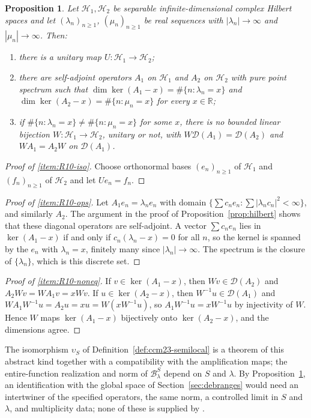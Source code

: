 \documentclass[11pt]{amsart}
\theoremstyle{plain}
\newtheorem{proposition}[theorem]{Proposition}
\theoremstyle{definition}
\theoremstyle{remark}
\numberwithin{equation}{section}
\newcommand{\R}{\mathbb{R}}
\newcommand{\cH}{\mathscr{H}}
\begin{document}
\begin{proposition}\label{prop:R10}
Let $\cH_1,\cH_2$ be separable infinite-dimensional complex Hilbert
spaces and let $(\lambda_n)_{n\ge1}$, $(\mu_n)_{n\ge1}$ be real sequences
with $|\lambda_n|\to\infty$ and $|\mu_n|\to\infty$. Then:
\begin{enumerate}[label=(\roman*)]
\item\label{item:R10-iso} there is a unitary map $U:\cH_1\to\cH_2$;
\item\label{item:R10-ops} there are self-adjoint operators $A_1$ on
  $\cH_1$ and $A_2$ on $\cH_2$ with pure point spectrum such that
  $\dim\ker(A_1-x)=\#\{n:\lambda_n=x\}$ and
  $\dim\ker(A_2-x)=\#\{n:\mu_n=x\}$ for every $x\in\R$;
\item\label{item:R10-noneq} if $\#\{n:\lambda_n=x\}\ne\#\{n:\mu_n=x\}$
  for some $x$, there is no bounded linear bijection
  $W:\cH_1\to\cH_2$, unitary or not, with
  $W\mathcal D(A_1)=\mathcal D(A_2)$ and $WA_1=A_2W$ on
  $\mathcal D(A_1)$.
\end{enumerate}
\end{proposition}

\begin{proof}[Proof of \ref{item:R10-iso}]
Choose orthonormal bases $(e_n)_{n\ge1}$ of $\cH_1$ and $(f_n)_{n\ge1}$
of $\cH_2$ and let $Ue_n=f_n$.
\end{proof}

\begin{proof}[Proof of \ref{item:R10-ops}]
Let $A_1e_n=\lambda_ne_n$ with domain
$\{\sum c_ne_n:\sum|\lambda_nc_n|^2<\infty\}$, and similarly $A_2$. The
argument in the proof of Proposition~\ref{prop:hilbert} shows that these
diagonal operators are self-adjoint. A vector $\sum c_ne_n$ lies in
$\ker(A_1-x)$ if and only if $c_n(\lambda_n-x)=0$ for all $n$, so the
kernel is spanned by the $e_n$ with $\lambda_n=x$, finitely many since
$|\lambda_n|\to\infty$. The spectrum is the closure of $\{\lambda_n\}$,
which is this discrete set.
\end{proof}

\begin{proof}[Proof of \ref{item:R10-noneq}]
If $v\in\ker(A_1-x)$, then $Wv\in\mathcal D(A_2)$ and
$A_2Wv=WA_1v=xWv$. If $u\in\ker(A_2-x)$, then
$W^{-1}u\in\mathcal D(A_1)$ and $WA_1W^{-1}u=A_2u=xu=W(xW^{-1}u)$,
so $A_1W^{-1}u=xW^{-1}u$ by injectivity of $W$. Hence $W$ maps
$\ker(A_1-x)$ bijectively onto $\ker(A_2-x)$, and the dimensions
agree.
\end{proof}

The isomorphism $\upsilon_S$ of Definition~\ref{def:ccm23-semilocal} is
a theorem of this abstract kind together with a compatibility with the
amplification maps; the entire-function realization and norm of
$\mathcal B^S_\lambda$ depend on $S$ and $\lambda$. By
Proposition~\ref{prop:R10}, an identification with the global space of
Section~\ref{sec:debranges} would need an intertwiner of the specified
operators, the same norm, a controlled limit in $S$ and $\lambda$, and
multiplicity data; none of these is supplied by
\cite[Proposition~4.8]{ConnesConsaniMoscovici2024Prolate}.
\end{document}
